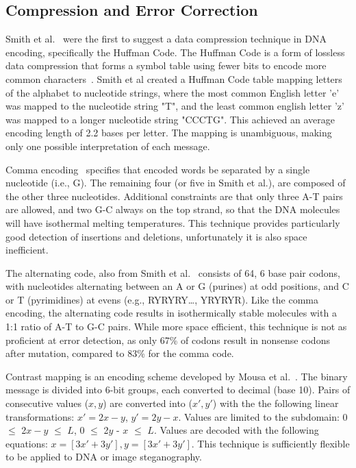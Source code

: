 \documentclass{bioinfo}
\begin{document}
\subsection{Compression and Error Correction}

Smith et al.~\cite{SFHC2003BL} were the first to suggest a data compression technique in DNA encoding, specifically the Huffman Code. The Huffman Code is a form of lossless data compression that forms a symbol table using fewer bits to encode more common characters~\cite{H1952POTIRE}. Smith et al created a Huffman Code table mapping letters of the alphabet to nucleotide strings, where the most common English letter 'e' was mapped to the nucleotide string "T", and the least common english letter 'z' was mapped to a longer nucleotide string "CCCTG". This achieved an average encoding length of 2.2 bases per letter. The mapping is unambiguous, making only one possible interpretation of each message.

Comma encoding~\cite{BVSPNAS2000} specifies that encoded words be separated by a single nucleotide (i.e., G). The remaining four (or five in Smith et al.), are composed of the other three nucleotides. Additional constraints are that only three A-T pairs are allowed, and two G-C always on the top strand, so that the DNA molecules will have isothermal melting temperatures. This technique provides particularly good detection of insertions and deletions, unfortunately it is also space inefficient.

The alternating code, also from Smith et al.~\cite{SFHC2003BL} consists of 64, 6 base pair codons, with nucleotides alternating between an A or G (purines) at odd positions, and C or T (pyrimidines) at evens (e.g., RYRYRY…, YRYRYR). Like the comma encoding, the alternating code results in isothermically stable molecules with a 1:1 ratio of A-T to G-C pairs. While more space efficient, this technique is not as proficient at error detection, as only 67\% of codons result in nonsense codons after mutation, compared to 83\% for the comma code.

Contrast mapping is an encoding scheme developed by Mousa et al.~\cite{MMAIAJI2011}. The binary message is divided into 6-bit groups, each converted to decimal (base 10). Pairs of consecutive values ($x, y$) are converted into ($x', y'$) with the the following linear transformations: $x' = 2x - y$,  $y' = 2y - x$. Values are limited to the subdomain:  0 $\leq$ 2$x - y$ $\leq$ $L$, 0 $\leq$ 2$y$ - $x$ $\leq$ $L$. Values are decoded with the following equations: $x = [3x' + 3y'], y = [3 x' + 3y']$. This technique is sufficiently flexible to be applied to DNA or image steganography.
\end{document}
